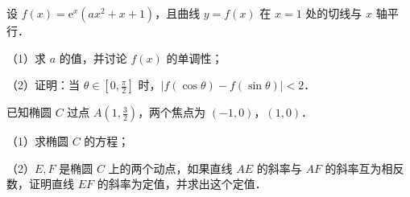 \begin{question}
设 $f(x)=\mathrm e^x(ax^2+x+1)$，且曲线 $y=f(x)$ 在 $x=1$ 处的切线与 $x$ 轴平行．

（1）求 $a$ 的值，并讨论 $f(x)$ 的单调性；

（2）证明：当 $\theta\in\left[0,\frac\pi2\right]$ 时，$|f(\cos\theta)-f(\sin\theta)|<2$．

\end{question}
\begin{question}
已知椭圆 $C$ 过点 $A\left(1,\frac32\right)$，两个焦点为 $(-1,0)$，$(1,0)$．

（1）求椭圆 $C$ 的方程；

（2）$E,F$ 是椭圆 $C$ 上的两个动点，如果直线 $AE$ 的斜率与 $AF$ 的斜率互为相反数，证明直线 $EF$ 的斜率为定值，并求出这个定值．

\end{question}
